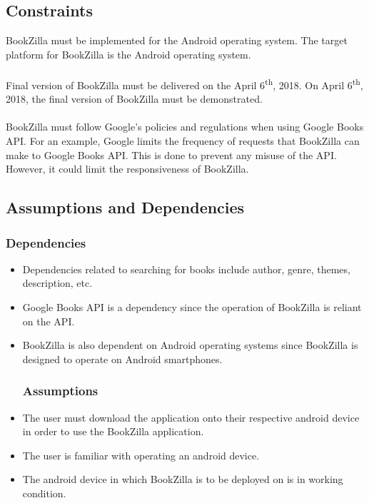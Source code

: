 \documentclass[12pt]{article}
\begin{document}
    \subsection{Constraints}
    \label{sub:constraints}
    BookZilla must be implemented for the Android operating system. The target platform for BookZilla is the Android operating system.\\\\
    \noindent Final version of BookZilla must be delivered on the April 6\textsuperscript{th}, 2018. On April 6\textsuperscript{th}, 2018, the final version of BookZilla must be demonstrated.\\\\
    BookZilla must follow Google's policies and regulations when using Google Books API. For an example, Google limits the frequency of requests that BookZilla can make to Google Books API. This is done to prevent any misuse of the API. However, it could limit the responsiveness of BookZilla.
    
    \subsection{Assumptions and Dependencies}
    \label{sub:assumptions_and_dependencies}
    \subsubsection{Dependencies}
    \begin{itemize}
        \item Dependencies related to searching for books include author, genre, themes, description, etc. 
        \item Google Books API is a dependency since the operation of BookZilla is reliant on the API.
        \item BookZilla is also dependent on Android operating systems since BookZilla is designed to operate on Android smartphones.
    \subsubsection{Assumptions}
        \item The user must download the application onto their respective android device in order to use the BookZilla application.
        \item The user is familiar with operating an android device.
        \item The android device in which BookZilla is to be deployed on is in working condition.
    \end{itemize}
    
\end{document}
